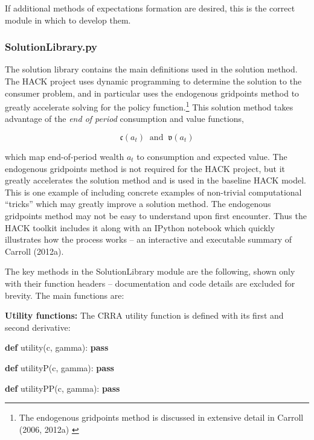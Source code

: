 \documentclass[]{article}
\newenvironment{Shaded}{}{}
\newcommand{\KeywordTok}[1]{\textcolor[rgb]{0.00,0.44,0.13}{\textbf{{#1}}}}
\newcommand{\NormalTok}[1]{{#1}}
\begin{document}
If additional methods of expectations formation are desired, this is the
correct module in which to develop them.
\hyperref[ux5cux23ux5cux2520Modelux5cux2520Extensionux5cux2520-ux7bux7d-ux5cux2520SECTIONux5cux2520TOux5cux2520ADD.ux5cux2520PERHAPSux5cux2520AFTERux5cux2520WRITINGux5cux2520THISux5cux2520WEEKux5cux2520FORux5cux2520RXux3f]{}

\subsubsection{SolutionLibrary.py}\label{solutionlibrary.py}

The solution library contains the main definitions used in the solution
method. The HACK project uses dynamic programming to determine the
solution to the consumer problem, and in particular uses the endogenous
gridpoints method to greatly accelerate solving for the policy
function.\footnote{The endogenous gridpoints method is discussed in
  extensive detail in Carroll (2006, 2012a) \href{REF}{}} This solution
method takes advantage of the \emph{end of period} consumption and value
functions,

\[\mathfrak{c}(a_t) \;\; \mathrm{ and } \;\;\mathfrak{v}(a_t) \]

which map end-of-period wealth $a_t$ to consumption and expected value.
The endogenous gridpoints method is not required for the HACK project,
but it greatly accelerates the solution method and is used in the
baseline HACK model. This is one example of including concrete examples
of non-trivial computational ``tricks'' which may greatly improve a
solution method. The endogenous gridpoints method may not be easy to
understand upon first encounter. Thus the HACK toolkit includes it along
with an IPython notebook which quickly illustrates how the process works
-- an interactive and executable summary of Carroll (2012a).
\href{REF}{}

The key methods in the SolutionLibrary module are the following, shown
only with their function headers -- documentation and code details are
excluded for brevity. The main functions are:

\textbf{Utility functions:} The CRRA utility function is defined with
its first and second derivative:

\begin{Shaded}
\begin{Highlighting}[]
\KeywordTok{def} \NormalTok{utility(c, gamma):}
    \KeywordTok{pass}

\KeywordTok{def} \NormalTok{utilityP(c, gamma):}
    \KeywordTok{pass}

\KeywordTok{def} \NormalTok{utilityPP(c, gamma):}
    \KeywordTok{pass}
\end{Highlighting}
\end{Shaded}
\end{document}
